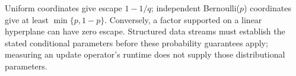 Uniform coordinates give escape $1-1/q$; independent Bernoulli($p$)
coordinates give at least $\min\{p,1-p\}$. Conversely, a factor
supported on a linear hyperplane can have zero escape. Structured data
streams must establish the stated conditional parameters before these
probability guarantees apply; measuring an update operator's runtime does
not supply those distributional parameters.
